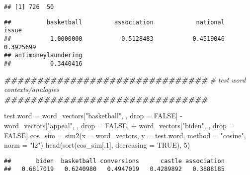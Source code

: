 \documentclass[
]{article}
\newenvironment{Shaded}{\begin{snugshade}}{\end{snugshade}}
\newcommand{\AttributeTok}[1]{\textcolor[rgb]{0.77,0.63,0.00}{#1}}
\newcommand{\CommentTok}[1]{\textcolor[rgb]{0.56,0.35,0.01}{\textit{#1}}}
\newcommand{\ConstantTok}[1]{\textcolor[rgb]{0.00,0.00,0.00}{#1}}
\newcommand{\DecValTok}[1]{\textcolor[rgb]{0.00,0.00,0.81}{#1}}
\newcommand{\DocumentationTok}[1]{\textcolor[rgb]{0.56,0.35,0.01}{\textbf{\textit{#1}}}}
\newcommand{\FunctionTok}[1]{\textcolor[rgb]{0.00,0.00,0.00}{#1}}
\newcommand{\NormalTok}[1]{#1}
\newcommand{\OtherTok}[1]{\textcolor[rgb]{0.56,0.35,0.01}{#1}}
\newcommand{\SpecialCharTok}[1]{\textcolor[rgb]{0.00,0.00,0.00}{#1}}
\newcommand{\StringTok}[1]{\textcolor[rgb]{0.31,0.60,0.02}{#1}}
\begin{document}
\begin{verbatim}
## [1] 726  50
\end{verbatim}

\begin{Shaded}
\end{Shaded}

\begin{verbatim}
##          basketball         association            national               issue 
##           1.0000000           0.5128483           0.4519046           0.3925699 
## antimoneylaundering 
##           0.3440416
\end{verbatim}

\begin{Shaded}
\begin{Highlighting}[]
\DocumentationTok{\#\#\#\#\#\#\#\#\#\#\#\#\#\#\#\#\#\#\#\#\#\#\#\#\#\#\#\#\#\#\#}
\CommentTok{\# test word contexts/analogies}
\DocumentationTok{\#\#\#\#\#\#\#\#\#\#\#\#\#\#\#\#\#\#\#\#\#\#\#\#\#\#\#\#\#\#\#}

\NormalTok{test.word }\OtherTok{=}\NormalTok{ word\_vectors[}\StringTok{"basketball"}\NormalTok{, , drop }\OtherTok{=} \ConstantTok{FALSE}\NormalTok{] }\SpecialCharTok{{-}}
\NormalTok{  word\_vectors[}\StringTok{"appeal"}\NormalTok{, , drop }\OtherTok{=} \ConstantTok{FALSE}\NormalTok{] }\SpecialCharTok{+}
\NormalTok{  word\_vectors[}\StringTok{"biden"}\NormalTok{, , drop }\OtherTok{=} \ConstantTok{FALSE}\NormalTok{]}
\NormalTok{cos\_sim }\OtherTok{=} \FunctionTok{sim2}\NormalTok{(}\AttributeTok{x =}\NormalTok{ word\_vectors, }\AttributeTok{y =}\NormalTok{ test.word, }\AttributeTok{method =} \StringTok{"cosine"}\NormalTok{, }\AttributeTok{norm =} \StringTok{"l2"}\NormalTok{)}
\FunctionTok{head}\NormalTok{(}\FunctionTok{sort}\NormalTok{(cos\_sim[,}\DecValTok{1}\NormalTok{], }\AttributeTok{decreasing =} \ConstantTok{TRUE}\NormalTok{), }\DecValTok{5}\NormalTok{)}
\end{Highlighting}
\end{Shaded}

\begin{verbatim}
##       biden  basketball conversions      castle association 
##   0.6817019   0.6240980   0.4947019   0.4289892   0.3888185
\end{verbatim}
\end{document}

